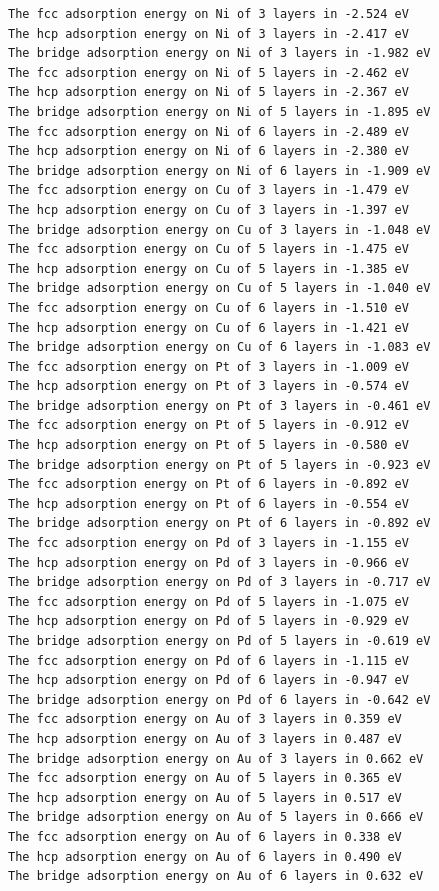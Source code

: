 \documentclass[11pt]{article}
\begin{document}
\begin{verbatim}
The fcc adsorption energy on Ni of 3 layers in -2.524 eV
The hcp adsorption energy on Ni of 3 layers in -2.417 eV
The bridge adsorption energy on Ni of 3 layers in -1.982 eV
The fcc adsorption energy on Ni of 5 layers in -2.462 eV
The hcp adsorption energy on Ni of 5 layers in -2.367 eV
The bridge adsorption energy on Ni of 5 layers in -1.895 eV
The fcc adsorption energy on Ni of 6 layers in -2.489 eV
The hcp adsorption energy on Ni of 6 layers in -2.380 eV
The bridge adsorption energy on Ni of 6 layers in -1.909 eV
The fcc adsorption energy on Cu of 3 layers in -1.479 eV
The hcp adsorption energy on Cu of 3 layers in -1.397 eV
The bridge adsorption energy on Cu of 3 layers in -1.048 eV
The fcc adsorption energy on Cu of 5 layers in -1.475 eV
The hcp adsorption energy on Cu of 5 layers in -1.385 eV
The bridge adsorption energy on Cu of 5 layers in -1.040 eV
The fcc adsorption energy on Cu of 6 layers in -1.510 eV
The hcp adsorption energy on Cu of 6 layers in -1.421 eV
The bridge adsorption energy on Cu of 6 layers in -1.083 eV
The fcc adsorption energy on Pt of 3 layers in -1.009 eV
The hcp adsorption energy on Pt of 3 layers in -0.574 eV
The bridge adsorption energy on Pt of 3 layers in -0.461 eV
The fcc adsorption energy on Pt of 5 layers in -0.912 eV
The hcp adsorption energy on Pt of 5 layers in -0.580 eV
The bridge adsorption energy on Pt of 5 layers in -0.923 eV
The fcc adsorption energy on Pt of 6 layers in -0.892 eV
The hcp adsorption energy on Pt of 6 layers in -0.554 eV
The bridge adsorption energy on Pt of 6 layers in -0.892 eV
The fcc adsorption energy on Pd of 3 layers in -1.155 eV
The hcp adsorption energy on Pd of 3 layers in -0.966 eV
The bridge adsorption energy on Pd of 3 layers in -0.717 eV
The fcc adsorption energy on Pd of 5 layers in -1.075 eV
The hcp adsorption energy on Pd of 5 layers in -0.929 eV
The bridge adsorption energy on Pd of 5 layers in -0.619 eV
The fcc adsorption energy on Pd of 6 layers in -1.115 eV
The hcp adsorption energy on Pd of 6 layers in -0.947 eV
The bridge adsorption energy on Pd of 6 layers in -0.642 eV
The fcc adsorption energy on Au of 3 layers in 0.359 eV
The hcp adsorption energy on Au of 3 layers in 0.487 eV
The bridge adsorption energy on Au of 3 layers in 0.662 eV
The fcc adsorption energy on Au of 5 layers in 0.365 eV
The hcp adsorption energy on Au of 5 layers in 0.517 eV
The bridge adsorption energy on Au of 5 layers in 0.666 eV
The fcc adsorption energy on Au of 6 layers in 0.338 eV
The hcp adsorption energy on Au of 6 layers in 0.490 eV
The bridge adsorption energy on Au of 6 layers in 0.632 eV
\end{verbatim}
\end{document}
